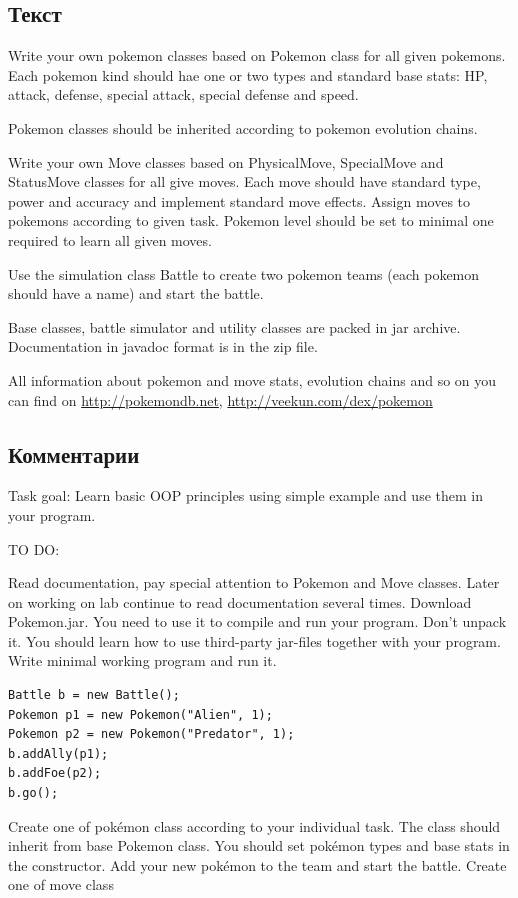 \documentclass[11pt]{article}
\begin{document}
\subsection{Текст}
\label{sec:org0079e1f}
\small
Write your own pokemon classes based on Pokemon class for all given pokemons. Each pokemon kind should hae one or two types and standard base stats: HP, attack, defense, special attack, special defense and speed.

Pokemon classes should be inherited according to pokemon evolution chains.

Write your own Move classes based on PhysicalMove, SpecialMove and StatusMove classes for all give moves. Each move should have standard type, power and accuracy and implement standard move effects. Assign moves to pokemons according to given task. Pokemon level should be set to minimal one required to learn all given moves.

Use the simulation class Battle to create two pokemon teams (each pokemon should have a name) and start the battle.

Base classes, battle simulator and utility classes are packed in jar archive. Documentation in javadoc format is in the zip file.

All information about pokemon and move stats, evolution chains and so on you can find on \url{http://pokemondb.net}, \url{http://veekun.com/dex/pokemon}

\subsection{Комментарии}
\label{sec:orgccc63f0}
Task goal: Learn basic OOP principles using simple example and use them in your program.

TO DO:

Read documentation, pay special attention to Pokemon and Move classes. Later on working on lab continue to read documentation several times.
Download Pokemon.jar. You need to use it to compile and run your program. Don't unpack it. You should learn how to use third-party jar-files together with your program.
Write minimal working program and run it.
\lstset{language=Java,label= ,caption= ,captionpos=b,numbers=none}
\begin{lstlisting}
Battle b = new Battle();
Pokemon p1 = new Pokemon("Alien", 1);
Pokemon p2 = new Pokemon("Predator", 1);
b.addAlly(p1);
b.addFoe(p2);
b.go();
\end{lstlisting}
Create one of pokémon class according to your individual task. The class should inherit from base Pokemon class. You should set pokémon types and base stats in the constructor. Add your new pokémon to the team and start the battle.
Create one of move class
\end{document}
